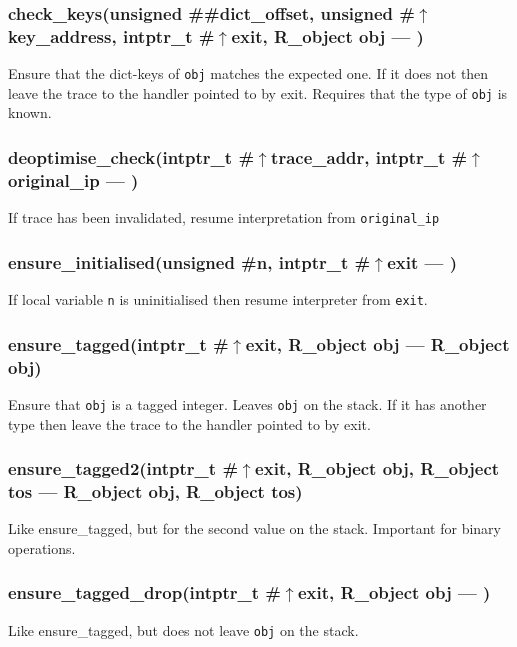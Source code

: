 \subsubsection{check\_keys(unsigned \#\#dict\_offset, unsigned \#$\uparrow$key\_address, intptr\_t \#$\uparrow$exit, R\_object obj --- )}
\vspace{-1em}Ensure that the dict-keys of \texttt{obj} matches the expected one. If it does not then leave the trace to the handler pointed to by exit. Requires that the type of \texttt{obj} is known. \vspace{-1em}
\subsubsection{deoptimise\_check(intptr\_t \#$\uparrow$trace\_addr, intptr\_t \#$\uparrow$original\_ip --- )}
\vspace{-1em}If trace has been invalidated, resume interpretation from \texttt{original\_ip} \vspace{-1em}
\subsubsection{ensure\_initialised(unsigned \#n, intptr\_t \#$\uparrow$exit --- )}
\vspace{-1em}If local variable \texttt{n} is uninitialised then resume interpreter from \texttt{exit}. \vspace{-1em}
\subsubsection{ensure\_tagged(intptr\_t \#$\uparrow$exit, R\_object obj --- R\_object obj)}
\vspace{-1em}Ensure that \texttt{obj} is a tagged integer. Leaves \texttt{obj} on the stack. If it has another type then leave the trace to the handler pointed to by exit. \vspace{-1em}
\subsubsection{ensure\_tagged2(intptr\_t \#$\uparrow$exit, R\_object obj, R\_object tos --- R\_object obj, R\_object tos)}
\vspace{-1em}Like ensure\_tagged, but for the second value on the stack. Important for binary operations. \vspace{-1em}
\subsubsection{ensure\_tagged\_drop(intptr\_t \#$\uparrow$exit, R\_object obj --- )}
\vspace{-1em}Like ensure\_tagged, but does not leave \texttt{obj} on the stack. \vspace{-1em}
